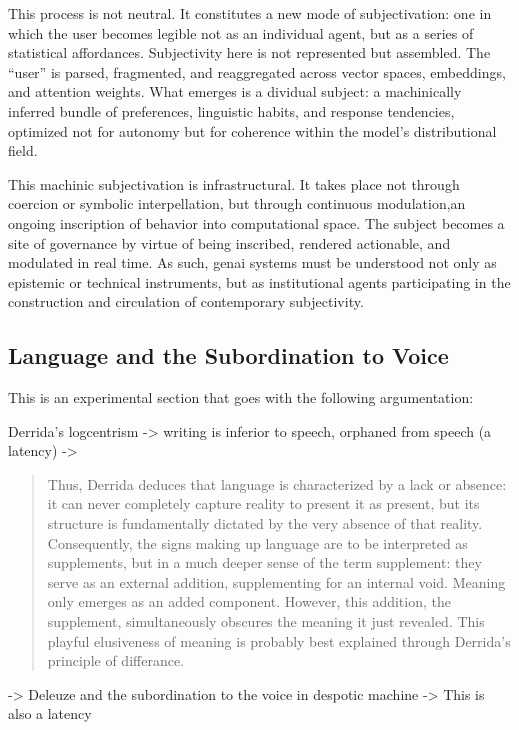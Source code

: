 This process is not neutral. It constitutes a new mode of subjectivation: one in which the user becomes legible not as an individual agent, but as a series of statistical affordances. Subjectivity here is not represented but assembled. The “user” is parsed, fragmented, and reaggregated across vector spaces, embeddings, and attention weights. What emerges is a dividual subject: a machinically inferred bundle of preferences, linguistic habits, and response tendencies, optimized not for autonomy but for coherence within the model's distributional field.

This machinic subjectivation is infrastructural. It takes place not through coercion or symbolic interpellation, but through continuous modulation,an ongoing inscription of behavior into computational space. The subject becomes a site of governance by virtue of being inscribed, rendered actionable, and modulated in real time. As such, \gls{genai} systems must be understood not only as epistemic or technical instruments, but as institutional agents participating in the construction and circulation of contemporary subjectivity.

\subsection{Language and the Subordination to Voice}

\begin{orangebox}
	This is an experimental section that goes with the following argumentation:

	Derrida's logcentrism -> writing is inferior to speech, orphaned from speech (a
	latency) ->

	\begin{quote}
		Thus, Derrida deduces that language is characterized by a lack or absence: it can never completely capture reality to present it as present, but its structure is fundamentally dictated by the very absence of that reality. Consequently, the signs making up language are to be interpreted as supplements, but in a much deeper sense of the term supplement: they serve as an external addition, supplementing for an internal void. Meaning only emerges as an added component. However, this addition, the supplement, simultaneously obscures the meaning it just revealed. This playful elusiveness of meaning is probably best explained through Derrida’s principle of differance. \parencite[8]{maas2023}
	\end{quote}

	-> Deleuze and the subordination to the voice in despotic machine -> This is
	also a latency
\end{orangebox}



